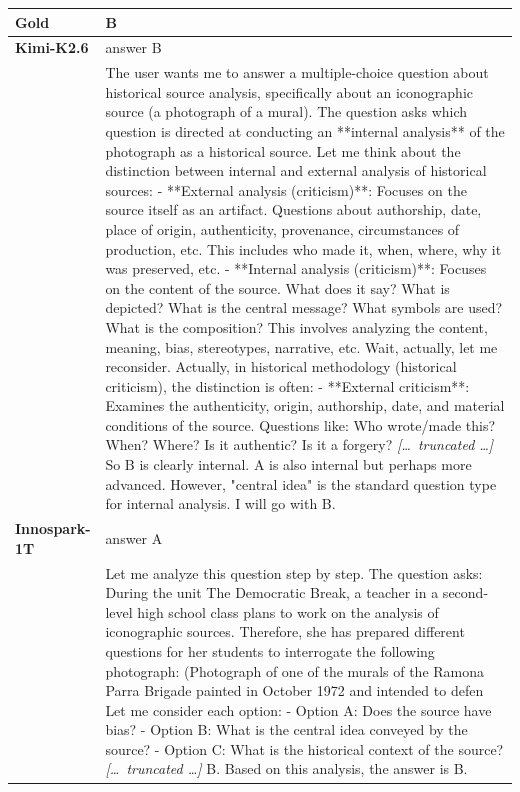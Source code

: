 \begin{longtable}{@{}l p{12.5cm}@{}}
  \textbf{Gold} & B \\
  \midrule
  \textbf{Kimi-K2.6} & answer B \\
  & The user wants me to answer a multiple-choice question about historical source analysis, specifically about an iconographic source (a photograph of a mural). The question asks which question is directed at conducting an **internal analysis** of the photograph as a historical source. \newline Let me think about the distinction between internal and external analysis of historical sources: \newline - **External analysis (criticism)**: Focuses on the source itself as an artifact. Questions about authorship, date, place of origin, authenticity, provenance, circumstances of production, etc. This includes who made it, when, where, why it was preserved, etc. \newline - **Internal analysis (criticism)**: Focuses on the content of the source. What does it say? What is depicted? What is the central message? What symbols are used? What is the composition? This involves analyzing the content, meaning, bias, stereotypes, narrative, etc. Wait, actually, let me reconsider. \newline Actually, in historical methodology (historical criticism), the distinction is often: \newline - **External criticism**: Examines the authenticity, origin, authorship, date, and material conditions of the source. Questions like: Who wrote/made this? When? Where? Is it authentic? Is it a forgery? \newline \textit{[\ldots\ truncated \ldots]} \newline So B is clearly internal. A is also internal but perhaps more advanced. However, "central idea" is the standard question type for internal analysis. \newline I will go with B. \\
  \textbf{Innospark-1T} & answer A \\
  & Let me analyze this question step by step. \newline The question asks: During the unit The Democratic Break, a teacher in a second-level high school class plans to work on the analysis of iconographic sources. Therefore, she has prepared different questions for her students to interrogate the following photograph: (Photograph of one of the murals of the Ramona Parra Brigade painted in October 1972 and intended to defen \newline Let me consider each option: \newline - Option A: Does the source have bias? \newline - Option B: What is the central idea conveyed by the source? \newline - Option C: What is the historical context of the source? \newline \textit{[\ldots\ truncated \ldots]} \newline B. \newline Based on this analysis, the answer is B. \\

\end{longtable}

